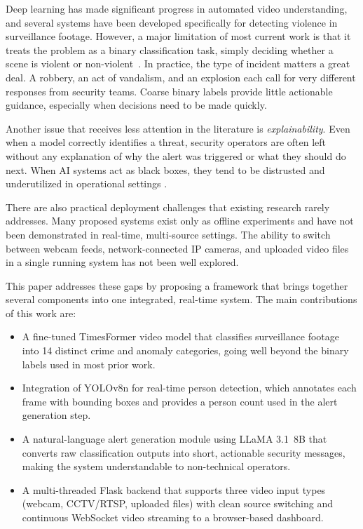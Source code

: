 \documentclass[conference]{IEEEtran}
\begin{document}
Deep learning has made significant progress in automated video
understanding, and several systems have been developed specifically for
detecting violence in surveillance footage. However, a major limitation
of most current work is that it treats the problem as a binary
classification task, simply deciding whether a scene is violent or
non-violent~\cite{khan2025}. In practice, the type of incident matters
a great deal. A robbery, an act of vandalism, and an explosion each call
for very different responses from security teams. Coarse binary labels
provide little actionable guidance, especially when decisions need to
be made quickly.

Another issue that receives less attention in the literature is
\textit{explainability}. Even when a model correctly identifies a
threat, security operators are often left without any explanation of why
the alert was triggered or what they should do next. When AI systems act
as black boxes, they tend to be distrusted and underutilized in
operational settings \cite{wang2025}.

There are also practical deployment challenges that existing research
rarely addresses. Many proposed systems exist only as offline experiments
and have not been demonstrated in real-time, multi-source settings. The
ability to switch between webcam feeds, network-connected IP cameras, and
uploaded video files in a single running system has not been well explored.

This paper addresses these gaps by proposing a framework that brings
together several components into one integrated, real-time system. The
main contributions of this work are:

\begin{itemize}
  \item A fine-tuned TimesFormer video model that classifies surveillance
        footage into 14 distinct crime and anomaly categories, going well
        beyond the binary labels used in most prior work.

  \item Integration of YOLOv8n for real-time person detection, which
        annotates each frame with bounding boxes and provides a person
        count used in the alert generation step.

  \item A natural-language alert generation module using LLaMA 3.1~8B
        that converts raw classification outputs into short, actionable
        security messages, making the system understandable to
        non-technical operators.

  \item A multi-threaded Flask backend that supports three video input
        types (webcam, CCTV/RTSP, uploaded files) with clean source
        switching and continuous WebSocket video streaming to a
        browser-based dashboard.
\end{itemize}
\end{document}
